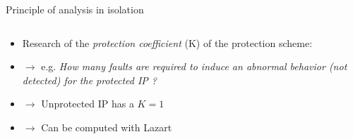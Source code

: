 \begin{frame}[fragile]{Principle of analysis in isolation}
\begin{columns}
\begin{small}
\begin{column}{0.75\textwidth}
\begin{itemize}
                    \item Research of the \textit{protection coefficient} (K) of the protection scheme:
                    \item[] $\rightarrow$ e.g. \textit{How many faults are required to induce an abnormal behavior (not detected) for the protected IP ?}
                    \item[] $\rightarrow$ Unprotected IP has a $K = 1$
                    \item[] $\rightarrow$ Can be computed with Lazart 
                \end{itemize}
            \end{column}             
        \end{small}
    \end{columns}
\end{frame}

